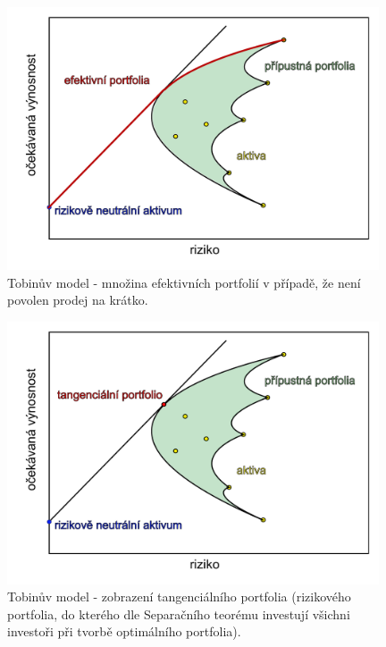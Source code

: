 \documentclass[a4paper,12pt]{report}
\theoremstyle{definition} \newtheorem{definice}[veta]{Definice}
\theoremstyle{remark}
\begin{document}
\begin{figure}[!htbp]
  \centering 
  \includegraphics[width=11cm]{IMG/graf_5b.pdf}
  \caption{Tobinův model - množina efektivních portfolií v případě, že není povolen prodej na krátko.}
  \label{obr_Tobin_1}
\end{figure}

\begin{figure}[!htbp]
  \centering 
  \includegraphics[width=11cm]{IMG/graf_1.pdf}
  \caption{Tobinův model - zobrazení tangenciálního portfolia (rizikového portfolia, do kterého dle Separačního teorému investují všichni investoři při tvorbě optimálního portfolia).}
  \label{obr_Tobin_2}
\end{figure}
\end{document}
